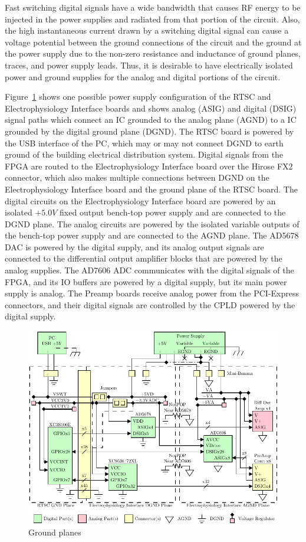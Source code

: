 Fast switching digital signals have a wide bandwidth that causes RF energy to be injected in the power supplies and radiated from that portion of the circuit.  Also, the high instantaneous current drawn by a switching digital signal can cause a voltage potential between the ground connections of the circuit and the ground at the power supply due to the non-zero resistance and inductance of ground planes, traces, and power supply leads.  Thus, it is desirable to have electrically isolated power and ground supplies for the analog and digital portions of the circuit.

Figure~\ref{fig:Ground} shows one possible power supply configuration of the RTSC and Electrophysiology Interface boards and shows analog (ASIG) and digital (DSIG) signal paths which connect an IC grounded to the analog plane (AGND) to a IC grounded by the digital ground plane (DGND).  The RTSC board is powered by the USB interface of the PC, which may or may not connect DGND to earth ground of the building electrical distribution system.  Digital signals from the FPGA are routed to the Electrophysiology Interface board over the Hirose FX2 connector, which also makes multiple connections between DGND on the Electrophysiology Interface board and the ground plane of the RTSC board.  The digital circuits on the Electrophysiology Interface board are powered by an isolated $+5.0\unit{V}$ fixed output bench-top power supply and are connected to the DGND plane.  The analog circuits are powered by the isolated variable outputs of the bench-top power supply and are connected to the AGND plane.  The AD5678 DAC is powered by the digital supply, and its analog output signals are connected to the differential output amplifier blocks that are powered by the analog supplies.  The AD7606 ADC communicates with the digital signals of the FPGA, and its IO buffers are powered by a digital supply, but its main power supply is analog.  The Preamp boards receive analog power from the PCI-Express connectors, and their digital signals are controlled by the CPLD powered by the digital supply.

\begin{figure}[h!]
	\centering 
		\includegraphics{./figures/Ground} 
	\caption{Ground planes\label{fig:Ground}}
\end{figure}


